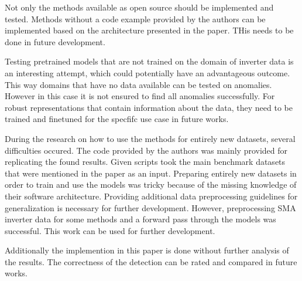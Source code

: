Not only the methods available as open source should be implemented and tested. Methods without a code example provided by the authors can be implemented based on the architecture presented in the paper. THis needs to be done in future development.

Testing pretrained models that are not trained on the domain of inverter data is an interesting attempt, which could potentially have an advantageous outcome. This way domains that have no data available can be tested on anomalies. However in this case it is not ensured to find all anomalies successfully. For robust representations that contain information about the data, they need to be trained and finetuned for the specfifc use case in future works.

During the research on how to use the methods for entirely new datasets, several difficulties occured. The code provided by the authors was mainly provided for replicating the found results. Given scripts took the main benchmark datasets that were mentioned in the paper as an input. Preparing entirely new datasets in order to train and use the models was tricky because of the missing knowledge of their software architecture. Providing additional data preprocessing guidelines for generalization is necessary for further development. However, preprocessing SMA inverter data for some methods and a forward pass through the models was successful. This work can be used for further development.

Additionally the implemention in this paper is done without further analysis of the results. The correctness of the detection can be rated and compared in future works.
